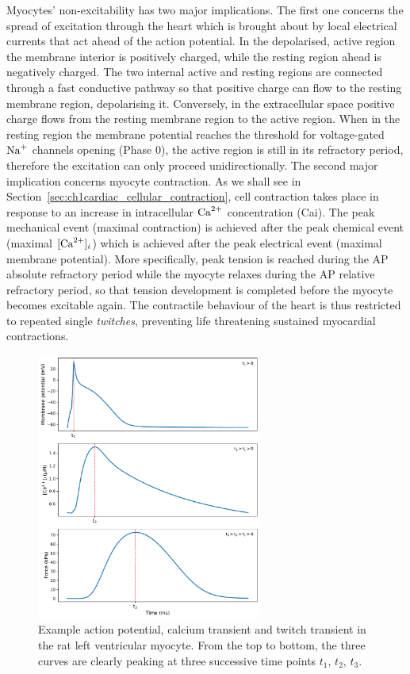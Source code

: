 \vspace{0.2cm}\noindent
Myocytes' non-excitability has two major implications. The first one concerns the spread of excitation through the heart which is brought about by local electrical currents that act ahead of the action potential. In the depolarised, active region the membrane interior is positively charged, while the resting region ahead is negatively charged. The two internal active and resting regions are connected through a fast conductive pathway so that positive charge can flow to the resting membrane region, depolarising it. Conversely, in the extracellular space positive charge flows from the resting membrane region to the active region. When in the resting region the membrane potential reaches the threshold for voltage-gated $\textrm{Na}^{+}$ channels opening (Phase $0$), the active region is still in its refractory period, therefore the excitation can only proceed unidirectionally. The second major implication concerns myocyte contraction. As we shall see in Section~\ref{sec:ch1cardiac_cellular_contraction}, cell contraction takes place in response to an increase in intracellular $\textrm{Ca}^{2+}$ concentration (\acs{Cai}). The peak mechanical event (maximal contraction) is achieved after the peak chemical event (maximal $[\textrm{Ca}^{2+}]_{i}$) which is achieved after the peak electrical event (maximal membrane potential). More specifically, peak tension is reached during the AP absolute refractory period while the myocyte relaxes during the AP relative refractory period, so that tension development is completed before the myocyte becomes excitable again. The contractile behaviour of the heart is thus restricted to repeated single \textit{twitches}, preventing life threatening sustained myocardial contractions.

\begin{figure}[!ht]
    \myfloatalign
    \includegraphics[width=0.66\textwidth]{figures/chapter01/three_peaks.pdf}
    \caption{Example action potential, calcium transient and twitch transient in the rat left ventricular myocyte. From the top to bottom, the three curves are clearly peaking at three successive time points $t_1,\,t_2,\,t_3$.}
    \label{fig:my_label1}
\end{figure}


